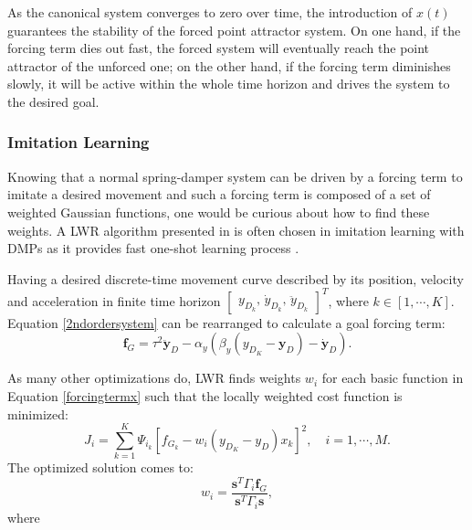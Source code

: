 As the canonical system converges to zero over time, the introduction of $x(t)$ guarantees the stability of the forced point attractor system. On one hand, if the forcing term dies out fast, the forced system will eventually reach the point attractor of the unforced one; on the other hand, if the forcing term diminishes slowly, it will be active within the whole time horizon and drives the system to the desired goal.


\subsubsection{Imitation Learning}
Knowing that a normal spring-damper system can be driven by a forcing term to imitate a desired movement and such a forcing term is composed of a set of weighted Gaussian functions, one would be curious about how to find these weights. A \ac{LWR} algorithm presented in \cite{schaal2002scalable} is often chosen in imitation learning with \ac{DMPs} as it provides fast one-shot learning process \cite{ijspeert2013dynamical}.

Having a desired discrete-time movement curve described by its position, velocity and acceleration in finite time horizon $ \begin{bmatrix}
y_{D_k},\,
\dot{y}_{D_k},\,
\ddot{y}_{D_k}
\end{bmatrix}^T$, where $k\in\left[1,\cdots, K\right] $. Equation \ref{2ndordersystem} can be rearranged to calculate a goal forcing term:
\begin{equation}
\bm{f}_{G}=\tau^2 \ddot{\bm{y}}_{D}-\alpha_y\left(\beta_y(y_{D_K}-\bm{y}_{D})- \dot{\bm{y}}_{D}\right).
\end{equation}

As many other optimizations do, LWR finds weights $ w_i $ for each basic function in Equation {\ref{forcingtermx}} such that the locally weighted cost function is minimized:
\begin{equation}
J_i=\sum_{k=1}^{K}\Psi_{i_k}\left[f_{G_k}-w_i\left(y_{D_K}-y_{{D}}\right)x_k\right]^2, \quad i = 1, \cdots, M.
\end{equation}
The optimized solution comes to:
\begin{equation}
w_i=\frac{\bm{s}^T\Gamma_i \bm{f}_G}{\bm{s}^T\Gamma_i \bm{s}},
\end{equation}
where

